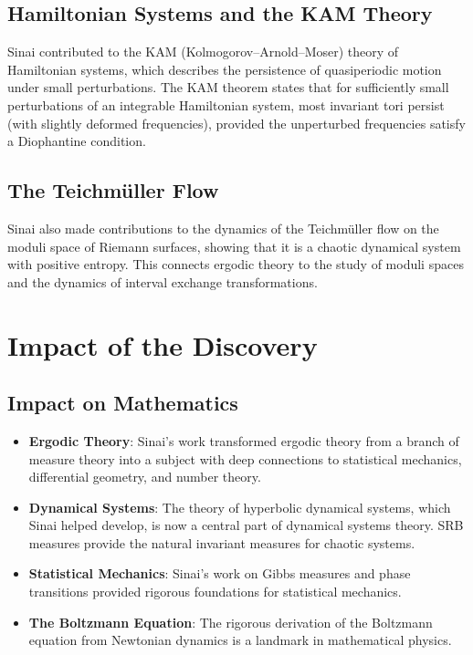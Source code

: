 \subsection{Hamiltonian Systems and the KAM Theory}

Sinai contributed to the KAM (Kolmogorov--Arnold--Moser) theory of Hamiltonian systems, which describes the persistence of quasiperiodic motion under small perturbations. The KAM theorem states that for sufficiently small perturbations of an integrable Hamiltonian system, most invariant tori persist (with slightly deformed frequencies), provided the unperturbed frequencies satisfy a Diophantine condition.

\subsection{The Teichm\"uller Flow}

Sinai also made contributions to the dynamics of the Teichm\"uller flow on the moduli space of Riemann surfaces, showing that it is a chaotic dynamical system with positive entropy. This connects ergodic theory to the study of moduli spaces and the dynamics of interval exchange transformations.

\section{Impact of the Discovery}

\subsection{Impact on Mathematics}

\begin{itemize}
\item \textbf{Ergodic Theory}: Sinai's work transformed ergodic theory from a branch of measure theory into a subject with deep connections to statistical mechanics, differential geometry, and number theory.
\item \textbf{Dynamical Systems}: The theory of hyperbolic dynamical systems, which Sinai helped develop, is now a central part of dynamical systems theory. SRB measures provide the natural invariant measures for chaotic systems.
\item \textbf{Statistical Mechanics}: Sinai's work on Gibbs measures and phase transitions provided rigorous foundations for statistical mechanics.
\item \textbf{The Boltzmann Equation}: The rigorous derivation of the Boltzmann equation from Newtonian dynamics is a landmark in mathematical physics.
\end{itemize}

